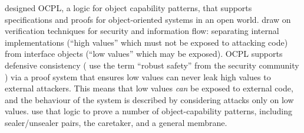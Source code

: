
 


\citet{ddd}  designed OCPL, a logic
for object capability patterns, that supports specifications and
proofs for object-oriented systems in an open world.  
draw on verification techniques for security and
information flow: separating internal implementations (``high values''
which must not be exposed to attacking code) from interface objects
(``low values'' which may be exposed).  OCPL supports defensive
consistency %
( use the term ``robust safety'' from the
security community \cite{Bengtson}) via a proof system that ensures
low values can never leak high values to external attackers. 
This means that low values \textit{can} be exposed to external code,
and the behaviour of the system is described by considering attacks only
on low values.  %
 use that logic to
prove a number of object-capability patterns, including
sealer/unsealer pairs, the caretaker, and a general membrane.

